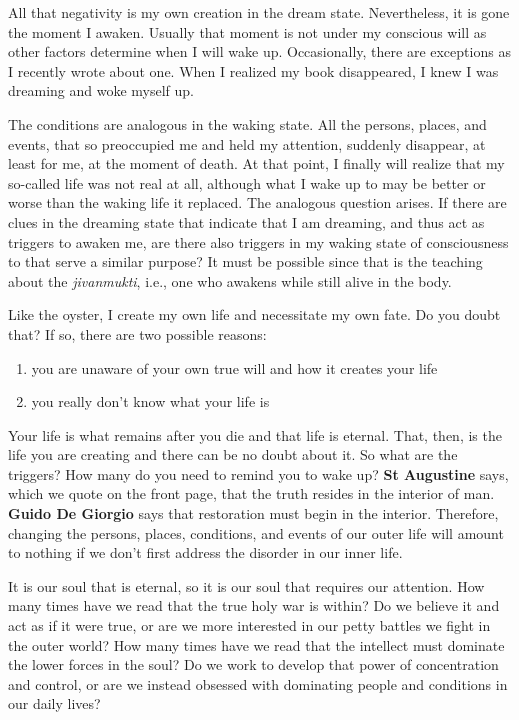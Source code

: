 All that negativity is my own creation in the dream state. Nevertheless, it is gone the moment I awaken. Usually that moment is not under my conscious will as other factors determine when I will wake up. Occasionally, there are exceptions as I recently wrote about one. When I realized my book disappeared, I knew I was dreaming and woke myself up.

The conditions are analogous in the waking state. All the persons, places, and events, that so preoccupied me and held my attention, suddenly disappear, at least for me, at the moment of death. At that point, I finally will realize that my so-called life was not real at all, although what I wake up to may be better or worse than the waking life it replaced. The analogous question arises. If there are clues in the dreaming state that indicate that I am dreaming, and thus act as triggers to awaken me, are there also triggers in my waking state of consciousness to that serve a similar purpose? It must be possible since that is the teaching about the \emph{jivanmukti}, i.e., one who awakens while still alive in the body.

Like the oyster, I create my own life and necessitate my own fate. Do you doubt that? If so, there are two possible reasons:

\begin{enumerate}


\item you are unaware of your own true will and how it creates your life

\item you really don't know what your life is
\end{enumerate}


Your life is what remains after you die and that life is eternal. That, then, is the life you are creating and there can be no doubt about it. So what are the triggers? How many do you need to remind you to wake up? \textbf{St Augustine} says, which we quote on the front page, that the truth resides in the interior of man. \textbf{Guido De Giorgio} says that restoration must begin in the interior. Therefore, changing the persons, places, conditions, and events of our outer life will amount to nothing if we don't first address the disorder in our inner life.

It is our soul that is eternal, so it is our soul that requires our attention. How many times have we read that the true holy war is within? Do we believe it and act as if it were true, or are we more interested in our petty battles we fight in the outer world? How many times have we read that the intellect must dominate the lower forces in the soul? Do we work to develop that power of concentration and control, or are we instead obsessed with dominating people and conditions in our daily lives?

